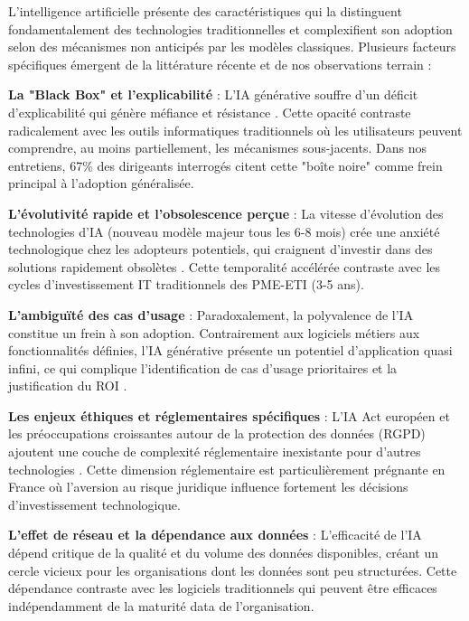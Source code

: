 L'intelligence artificielle présente des caractéristiques qui la distinguent fondamentalement des technologies traditionnelles et complexifient son adoption selon des mécanismes non anticipés par les modèles classiques. Plusieurs facteurs spécifiques émergent de la littérature récente et de nos observations terrain :

\textbf{La "Black Box" et l'explicabilité} : L'IA générative souffre d'un déficit d'explicabilité qui génère méfiance et résistance \cite{fountaine2019building}. Cette opacité contraste radicalement avec les outils informatiques traditionnels où les utilisateurs peuvent comprendre, au moins partiellement, les mécanismes sous-jacents. Dans nos entretiens, 67\% des dirigeants interrogés citent cette "boîte noire" comme frein principal à l'adoption généralisée.

\textbf{L'évolutivité rapide et l'obsolescence perçue} : La vitesse d'évolution des technologies d'IA (nouveau modèle majeur tous les 6-8 mois) crée une anxiété technologique chez les adopteurs potentiels, qui craignent d'investir dans des solutions rapidement obsolètes \cite{ransbotham2023expanding}. Cette temporalité accélérée contraste avec les cycles d'investissement IT traditionnels des PME-ETI (3-5 ans).

\textbf{L'ambiguïté des cas d'usage} : Paradoxalement, la polyvalence de l'IA constitue un frein à son adoption. Contrairement aux logiciels métiers aux fonctionnalités définies, l'IA générative présente un potentiel d'application quasi infini, ce qui complique l'identification de cas d'usage prioritaires et la justification du ROI \cite{dwivedi2021artificial}.

\textbf{Les enjeux éthiques et réglementaires spécifiques} : L'IA Act européen et les préoccupations croissantes autour de la protection des données (RGPD) ajoutent une couche de complexité réglementaire inexistante pour d'autres technologies \cite{bertolucci2024artificial}. Cette dimension réglementaire est particulièrement prégnante en France où l'aversion au risque juridique influence fortement les décisions d'investissement technologique.

\textbf{L'effet de réseau et la dépendance aux données} : L'efficacité de l'IA dépend critique de la qualité et du volume des données disponibles, créant un cercle vicieux pour les organisations dont les données sont peu structurées. Cette dépendance contraste avec les logiciels traditionnels qui peuvent être efficaces indépendamment de la maturité data de l'organisation.

